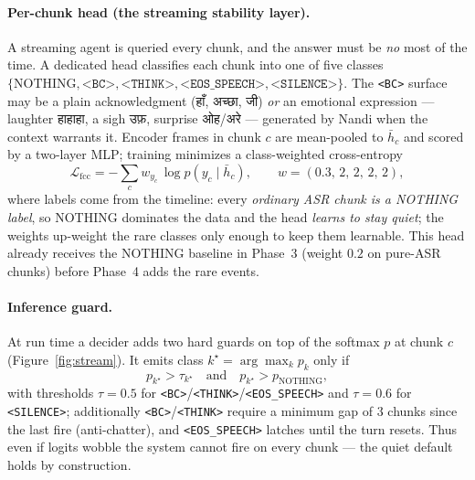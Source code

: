 \documentclass[11pt]{article}
\newcommand{\flag}[1]{\texttt{<#1>}}
\begin{document}
\paragraph{Per-chunk head (the streaming stability layer).} A streaming agent is queried
every chunk, and the answer must be \emph{no} most of the time. A dedicated head classifies
each chunk into one of five classes
$\{\text{NOTHING},\flag{BC},\flag{THINK},\flag{EOS\_SPEECH},\flag{SILENCE}\}$. The
\flag{BC} surface may be a plain acknowledgment (\deva हाँ, अच्छा, जी) \emph{or} an emotional
expression --- laughter \deva हाहाहा, a sigh \deva उफ़, surprise \deva ओह/अरे --- generated by
Nandi when the context warrants it. Encoder frames
in chunk $c$ are mean-pooled to $\bar h_c$ and scored by a two-layer MLP; training minimizes
a class-weighted cross-entropy
\begin{equation}
\mathcal{L}_{\text{fcc}}=-\sum_{c} w_{y_c}\,\log p(y_c\mid \bar h_c),\qquad
w=(0.3,\,2,\,2,\,2,\,2),
\end{equation}
where labels come from the timeline: every \emph{ordinary ASR chunk is a NOTHING label}, so
NOTHING dominates the data and the head \emph{learns to stay quiet}; the weights up-weight
the rare classes only enough to keep them learnable. This head already receives the NOTHING
baseline in Phase~3 (weight $0.2$ on pure-ASR chunks) before Phase~4 adds the rare events.

\paragraph{Inference guard.} At run time a decider adds two hard guards on top of the
softmax $p$ at chunk $c$ (Figure~\ref{fig:stream}). It emits class $k^\star=\arg\max_k p_k$
only if
\begin{equation}
p_{k^\star} > \tau_{k^\star}\quad\text{and}\quad p_{k^\star} > p_{\text{NOTHING}},
\end{equation}
with thresholds $\tau=0.5$ for \flag{BC}/\flag{THINK}/\flag{EOS\_SPEECH} and $\tau=0.6$ for
\flag{SILENCE}; additionally \flag{BC}/\flag{THINK} require a minimum gap of $3$ chunks since
the last fire (anti-chatter), and \flag{EOS\_SPEECH} latches until the turn resets. Thus even
if logits wobble the system cannot fire on every chunk --- the quiet default holds by
construction.
\end{document}
